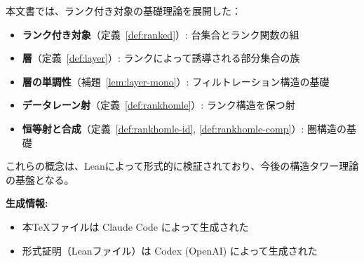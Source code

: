 \documentclass[a4paper,12pt]{ltjsarticle}
\theoremstyle{definition}
\begin{document}
本文書では、ランク付き対象の基礎理論を展開した：
\begin{itemize}
\item \textbf{ランク付き対象}（定義~\ref{def:ranked}）: 台集合とランク関数の組
\item \textbf{層}（定義~\ref{def:layer}）: ランクによって誘導される部分集合の族
\item \textbf{層の単調性}（補題~\ref{lem:layer-mono}）: フィルトレーション構造の基礎
\item \textbf{データレーン射}（定義~\ref{def:rankhomle}）: ランク構造を保つ射
\item \textbf{恒等射と合成}（定義~\ref{def:rankhomle-id}, \ref{def:rankhomle-comp}）: 圏構造の基礎
\end{itemize}

これらの概念は、Leanによって形式的に検証されており、今後の構造タワー理論の基盤となる。

\vspace{1em}

\noindent
\textbf{生成情報:}
\begin{itemize}
\item 本TeXファイルは Claude Code によって生成された
\item 形式証明（Leanファイル）は Codex (OpenAI) によって生成された
\end{itemize}
\end{document}
